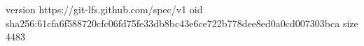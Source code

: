 version https://git-lfs.github.com/spec/v1
oid sha256:61cfa6f588720cfc06fd75fe33db8bc43e6ce722b778dee8ed0a0cd007303bca
size 4483
